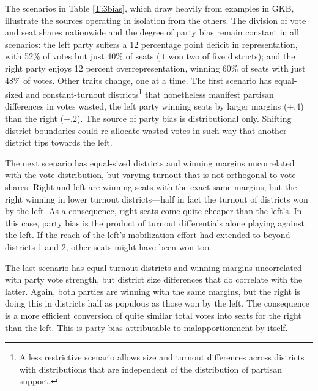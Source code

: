 \documentclass[letter,12pt]{article}
\begin{document}
The scenarios in Table \ref{T:3bias}, which draw heavily from examples in GKB, illustrate the sources operating in isolation from the others. The division of vote and seat shares nationwide and the degree of party bias remain constant in all scenarios: the left party suffers a 12 percentage point deficit in representation, with 52\% of votes but just 40\% of seats (it won two of five districts); and the right party enjoys 12 percent overrepresentation, winning 60\% of seats with just 48\% of votes. Other traits change, one at a time. The first scenario has equal-sized and constant-turnout districts\footnote{A less restrictive scenario allows size and turnout differences across districts with distributions that are independent of the distribution of partisan support.} that nonetheless manifest partisan differences in votes wasted, the left party winning seats by larger margins ($+.4$) than the right ($+.2$). The source of party bias is distributional only. Shifting district boundaries could re-allocate wasted votes in such way that another district tips towards the left. 

The next scenario has equal-sized districts and winning margins uncorrelated with the vote distribution, but varying turnout that is not orthogonal to vote shares. Right and left are winning seats with the exact same margins, but the right winning in lower turnout districts---half in fact the turnout of districts won by the left. As a consequence, right seats come quite cheaper than the left's. In this case, party bias is the product of turnout differentials alone playing against the left. If the reach of the left's mobilization effort had extended to beyond districts 1 and 2, other seats might have been won too. 

The last scenario has equal-turnout districts and winning margins uncorrelated with party vote strength, but district size differences that do correlate with the latter. Again, both parties are winning with the same margins, but the right is doing this in districts half as populous as those won by the left. The consequence is a more efficient conversion of quite similar total votes into seats for the right than the left. This is party bias attributable to malapportionment by itself.  
\end{document}
